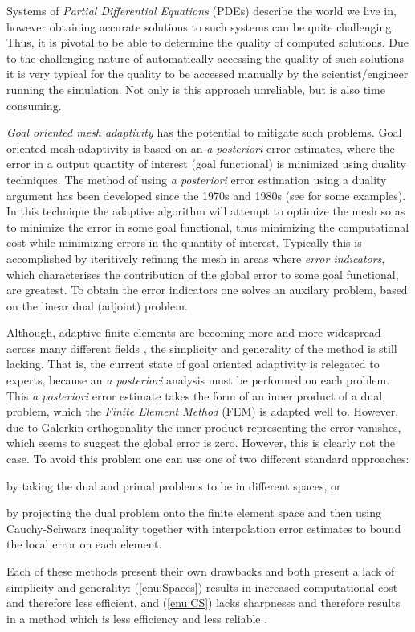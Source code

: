 Systems of \emph{Partial Differential Equations} (PDEs) describe the world we
live in, however obtaining accurate solutions to such systems can be quite
challenging. Thus, it is pivotal to be able to determine the quality of computed
solutions. Due to the challenging nature of automatically accessing the quality
of such solutions it is very typical for the quality to be accessed manually by
the scientist/engineer running the simulation. Not only is this approach
unreliable, but is also time consuming.

\emph{Goal oriented mesh adaptivity} has the potential to mitigate such
problems.  Goal oriented mesh adaptivity is based on an {\it a posteriori} error
estimates, where the error in a output quantity of interest (goal functional) is
minimized using duality techniques. The method of using {\it a posteriori} error
estimation using a duality argument has been developed since the 1970s and 1980s
(see \cite{Babuska1978, Babuska1981, Verfurth1989} for some examples).  In this
technique the adaptive algorithm will attempt to optimize the mesh so as to
minimize the error in some goal functional, thus minimizing the computational
cost while minimizing errors in the quantity of interest. Typically this is
accomplished by iteritively refining the mesh in areas where \emph{error
indicators}, which characterises the contribution of the global error to some
goal functional, are greatest. To obtain the error indicators one solves an
auxilary problem, based on the linear dual (adjoint) problem.

Although, adaptive finite elements are becoming more and more widespread
across many different fields \cite{Eriksson1995, Behrens1998, Becker2001,
Rognes2010, Hoffman2011, Izarra2014, Jansson2014a}, the simplicity and
generality of the method is still lacking. That is, the current state of goal
oriented adaptivity is relegated to experts, because an {\it a posteriori}
analysis must be performed on each problem. This {\it a posteriori} error
estimate takes the form of an inner product of a dual problem, which the
\emph{Finite Element Method} (FEM) is adapted well to. However, due to Galerkin
orthogonality the inner product representing the error vanishes, which seems to
suggest the global error is zero. However, this is clearly not the case. To
avoid this problem one can use one of two different standard approaches:
\begin{inparaenum}[(i)]
    \item \label{enu:Spaces} by taking the dual and primal problems to be
        in different spaces, or
    \item \label{enu:CS} by projecting the dual problem onto the finite
        element space and then using Cauchy-Schwarz inequality together with
        interpolation error estimates to bound the local error on each
        element.
\end{inparaenum}
Each of these methods present their own drawbacks and both present a lack of
simplicity and generality: (\ref{enu:Spaces}) results in increased computational
cost and therefore less efficient, and (\ref{enu:CS}) lacks sharpnesss and
therefore results in a method which is less efficiency and less reliable
\cite{Jansson2014b}.

